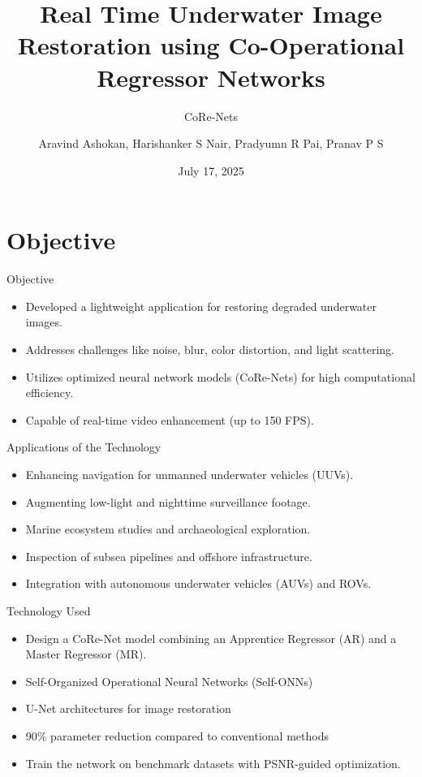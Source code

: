 \documentclass[aspectratio=169,xcolor=dvipsnames]{beamer}
\title{Real Time Underwater Image Restoration
using Co-Operational Regressor Networks}
\subtitle{CoRe-Nets}
\author{Aravind Ashokan, Harishanker S Nair, Pradyumn R Pai, Pranav P S}
\institute
{
    Department of Computer Science and Engineering \\
    Govt. Model Engineering College
}
\date{July 17, 2025} %
\begin{document}
\begin{frame}
    \titlepage
\end{frame}


\section{Objective}
\begin{frame}{Objective}
\begin{itemize}
    \item Developed a lightweight application for restoring degraded underwater images.
    \item Addresses challenges like noise, blur, color distortion, and light scattering.
    \item Utilizes optimized neural network models (CoRe-Nets) for high computational efficiency.
    \item Capable of real-time video enhancement (up to 150 FPS).
\end{itemize}
\end{frame}

\begin{frame}{Applications of the Technology}
\begin{itemize}
    \item Enhancing navigation for unmanned underwater vehicles (UUVs).
    \item Augmenting low-light and nighttime surveillance footage.
    \item Marine ecosystem studies and archaeological exploration.
    \item Inspection of subsea pipelines and offshore infrastructure.
    \item Integration with autonomous underwater vehicles (AUVs) and ROVs.
\end{itemize}
\end{frame}

\begin{frame}{Technology Used}
\begin{itemize}
    \item Design a CoRe-Net model combining an Apprentice Regressor (AR) and a Master Regressor (MR).
    \item Self-Organized Operational Neural Networks (Self-ONNs)
    \item U-Net architectures for image restoration
    \item 90\% parameter reduction compared to conventional methods
    \item Train the network on benchmark datasets with PSNR-guided optimization.
\end{itemize}
\end{frame}
\end{document}
